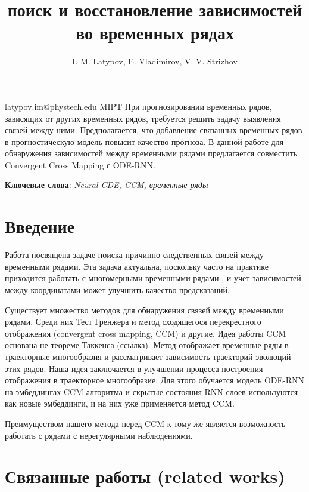 \documentclass[12pt, twoside]{article}
\begin{document}
\title
	[поиск и восстановление зависимостей во временных рядах]
	{поиск и восстановление зависимостей во временных рядах}
\author
	[I. M. Latypov]
	{I. M. Latypov, E. Vladimirov, V. V. Strizhov}
\email
	{latypov.im@phystech.edu}
\organization	
	{MIPT}	
\abstract
	{
		При прогнозировании временных рядов, зависящих от других временных рядов, требуется решить задачу выявления связей между ними.
		Предполагается, что добавление связанных временных рядов в прогностическую модель повысит качество прогноза. В данной работе для
		обнаружения зависимостей между временными рядами предлагается совместить Convergent Cross Mapping с ODE-RNN. 
		}
\bigskip
\noindent

\maketitle
\textbf{Ключевые слова}: \emph{Neural CDE, CCM, временные ряды}

\section{Введение}
	Работа посвящена задаче поиска причинно-следственных связей между временными рядами.
	Эта задача актуальна, поскольку часто на практике приходится работать с многомерными временными рядами \citep{dataset_mlru}, и учет зависимостей между координатами может улучшить качество предсказаний. 
		
		Существует множество методов для обнаружения связей между временными рядами. Среди них Тест Гренжера и метод сходящегося перекрестного отображения
	(convergent cross mapping, CCM) и другие. Идея работы CCM основана не теореме Таккенса (ссылка). Метод отображает временные ряды в траекторные многообразия и рассматривает зависимость траекторий эволюций этих рядов. Наша идея заключается в улучшении процесса построения отображения в траекторное многообразие. Для этого обучается модель ODE-RNN на эмбеддингах CCM алгоритма и скрытые состояния RNN слоев используются как новые эмбеддинги, и на них уже применяется метод CCM. 
		
		Преимуществом нашего метода перед CCM к тому же является возможность работать с рядами с нерегулярными наблюдениями.
	
	
\section{Связанные работы (related works)}
		
\end{document}
